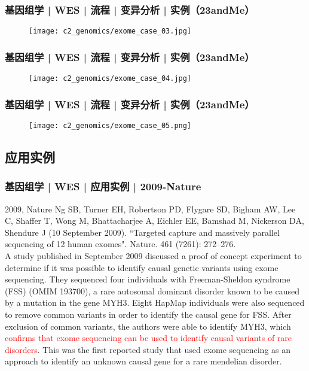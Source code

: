 \begin{frame}
  \frametitle{基因组学 | WES | 流程 | 变异分析 | 实例（23andMe）}
  \begin{figure}
    \centering
    \texttt{[image: c2\_genomics/exome\_case\_03.jpg]}
  \end{figure}
\end{frame}

\begin{frame}
  \frametitle{基因组学 | WES | 流程 | 变异分析 | 实例（23andMe）}
  \begin{figure}
    \centering
    \texttt{[image: c2\_genomics/exome\_case\_04.jpg]}
  \end{figure}
\end{frame}

\begin{frame}
  \frametitle{基因组学 | WES | 流程 | 变异分析 | 实例（23andMe）}
  \begin{figure}
    \centering
    \texttt{[image: c2\_genomics/exome\_case\_05.png]}
  \end{figure}
\end{frame}

\subsection{应用实例}
\begin{frame}
  \frametitle{基因组学 | WES | 应用实例 | 2009-Nature}
  \footnotesize{
    \begin{block}{2009, Nature}
  Ng SB, Turner EH, Robertson PD, Flygare SD, Bigham AW, Lee C, Shaffer T, Wong M, Bhattacharjee A, Eichler EE, Bamshad M, Nickerson DA, Shendure J (10 September 2009). ``Targeted capture and massively parallel sequencing of 12 human exomes". Nature. 461 (7261): 272–276.\\
  \vspace{1em}
  A study published in September 2009 discussed a proof of concept experiment to determine if it was possible to identify causal genetic variants using exome sequencing. They sequenced four individuals with Freeman-Sheldon syndrome (FSS) (OMIM 193700), a rare autosomal dominant disorder known to be caused by a mutation in the gene MYH3. Eight HapMap individuals were also sequenced to remove common variants in order to identify the causal gene for FSS. After exclusion of common variants, the authors were able to identify MYH3, which \textcolor{red}{confirms that exome sequencing can be used to identify causal variants of rare disorders}. This was the first reported study that used exome sequencing as an approach to identify an unknown causal gene for a rare mendelian disorder.
    \end{block}
}
\end{frame}

